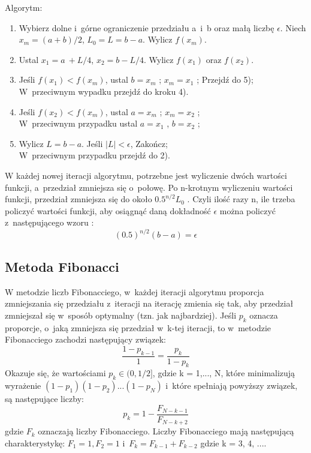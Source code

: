 \documentclass{classrep}
\begin{document}
Algorytm:
\begin{enumerate}
\item Wybierz dolne i~górne ograniczenie przedziału a~i~b oraz małą liczbę $\epsilon$. Niech $x_m = (a + b)/2$, $L_0 =L=b-a$. Wylicz $f(x_m )$.
\item Ustal $x_1 = a~+ L/4$, $x_2 = b - L/4$. Wylicz $f(x_1 )$ oraz $f(x_2 )$.
\item Jeśli $f(x_1 ) < f(x_m )$, ustal $b = x_m$ ; $x_m = x_1$ ; Przejdź do 5);\\
 W~przeciwnym wypadku przejdź do kroku 4).
\item Jeśli $f(x_2 ) < f(x_m )$, ustal $a = x_m$ ; $x_m = x_2$ ;\\
 W~przeciwnym przypadku ustal $a = x_1$ , $b = x_2$ ;
\item Wylicz $L = b - a$. Jeśli $|L| < \epsilon$, Zakończ;\\
 W~przeciwnym przypadku przejdź do 2).
\end{enumerate}

W każdej nowej iteracji algorytmu, potrzebne jest wyliczenie dwóch wartości funkcji, a~przedział zmniejsza się o~połowę. Po n-krotnym wyliczeniu wartości funkcji, przedział zmniejsza się do około $0.5^{n/2} L_0$ . Czyli ilość razy n, ile trzeba policzyć wartości funkcji, aby osiągnąć daną dokładność $\epsilon$ można policzyć z~następującego wzoru : 
\begin{equation}
(0.5)^{n/2} (b - a) = \epsilon
\end{equation}

\subsection{Metoda Fibonacci \cite{1}}

W metodzie liczb Fibonacciego, w~każdej iteracji algorytmu proporcja zmniejszania się przedziału z~iteracji na iterację zmienia się tak, aby przedział zmniejszał się w~sposób optymalny (tzn. jak najbardziej). Jeśli $p_k$ oznacza proporcje, o~jaką zmniejsza się przedział w~k-tej iteracji, to w~metodzie Fibonacciego zachodzi następujący związek:
\begin{equation}
\frac{1-p_{k-1}}{1} = \frac{p_k}{1-p_k}
\end{equation}
Okazuje się, że wartościami $p_k \in (0, 1/2]$, gdzie k = 1,..., N, które minimalizują wyrażenie $(1-p_1)(1-p_2)...(1-p_N)$ i~które spełniają powyższy związek, są następujące liczby:
\begin{equation}
p_k=1-\frac{F_{N-k-1}}{F_{N-k+2}}
\end{equation}
gdzie $F_k$ oznaczają liczby Fibonacciego. Liczby Fibonacciego mają następującą charakterystykę: $F_1 = 1, F_2 = 1$ i~$F_k = F_{k-1} + F_{k-2}$ gdzie k = 3, 4, ....
\end{document}
